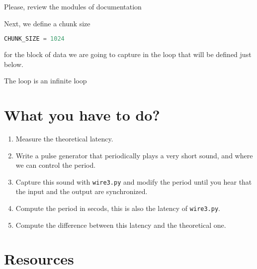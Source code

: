Please, review the modules of documentation 

Next, we define a chunk size
\begin{lstlisting}[language=Python]
CHUNK_SIZE = 1024
\end{lstlisting}
for the block of data we are going to capture in the loop that will
be defined just below.

The loop is an infinite loop

\section{What you have to do?}

\begin{enumerate}

\item Measure the theoretical latency.

\item Write a pulse generator that periodically plays a very short
  sound, and where we can control the period.

\item Capture this sound with \texttt{wire3.py} and modify the period
  until you hear that the input and the output are synchronized.

\item Compute the period in secods, this is also the latency of
  \texttt{wire3.py}.

\item Compute the difference between this latency and the theoretical
  one.

\end{enumerate}

\section{Resources}

